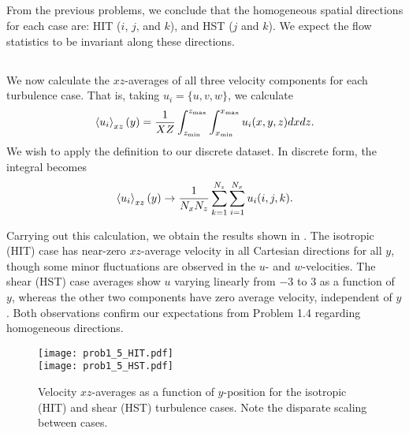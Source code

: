 \documentclass[11pt]{article}
\begin{document}
\subsection{}

From the previous problems, we conclude that the homogeneous spatial directions for each case are: HIT ($i$, $j$, and $k$), and HST ($j$ and $k$). We expect the flow statistics to be invariant along these directions.

\subsection{}

We now calculate the $xz$-averages of all three velocity components for each turbulence case. That is, taking $u_i = \{ u, v, w \}$, we calculate
\begin{equation}
\left< u_i \right>_{xz}(y)
=
\frac{1}{XZ}
\int_{z_\text{min}}^{z_\text{max}}
\int_{x_\text{min}}^{x_\text{max}}
u_i(x,y,z) dx dz
.
\end{equation}
We wish to apply the definition to our discrete dataset. In discrete form, the integral becomes
\begin{equation}
\left< u_i \right>_{xz}(y)
\rightarrow
\frac{1}{N_x N_z}
\sum_{k=1}^{N_z}
\sum_{i=1}^{N_x}
u_i(i,j,k)
.
\end{equation}

Carrying out this calculation, we obtain the results shown in . The isotropic (HIT) case has near-zero $xz$-average velocity in all Cartesian directions for all $y$, though some minor fluctuations are observed in the $u$- and $w$-velocities. The shear (HST) case averages show $u$ varying linearly from $-3$ to $3$ as a function of $y$, whereas the other two components have zero average velocity, independent of $y$. Both observations confirm our expectations from Problem 1.4 regarding homogeneous directions.

\begin{figure}[t]
\centering
\texttt{[image: prob1\_5\_HIT.pdf]}
\\
\texttt{[image: prob1\_5\_HST.pdf]}
\\[6pt]
\caption{Velocity $xz$-averages as a function of $y$-position for the isotropic (HIT) and shear (HST) turbulence cases. Note the disparate scaling between cases.}
\label{fig:prob_1_5_xzaverages}
\end{figure}

\subsection{}
\end{document}
